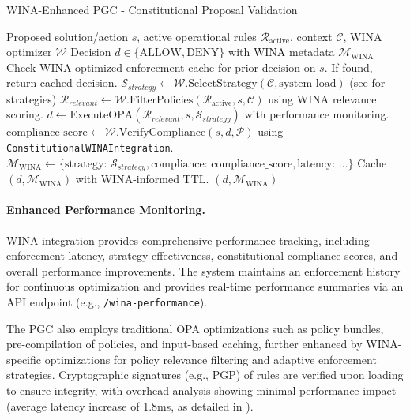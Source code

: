 \documentclass[manuscript,screen,review,anonymous,9pt]{acmart}
\begin{document}
\begin{algorithm}[!htbp]
\caption{WINA-Enhanced PGC - Constitutional Proposal Validation}
\label{alg:wina_pgc_validation}
\begin{algorithmic}[1]
\Require Proposed solution/action $s$, active operational rules $\mathcal{R}_{\text{active}}$, context $\mathcal{C}$, WINA optimizer $\mathcal{W}$
\Ensure Decision $d \in \{\text{ALLOW}, \text{DENY}\}$ with WINA metadata $\mathcal{M}_{\text{WINA}}$
    \State Check WINA-optimized enforcement cache for prior decision on $s$. If found, return cached decision.
    \State $\mathcal{S}_{strategy} \gets \mathcal{W}.\text{SelectStrategy}(\mathcal{C}, \text{system\_load})$ (see  for strategies)
    \State $\mathcal{R}_{relevant} \gets \mathcal{W}.\text{FilterPolicies}(\mathcal{R}_{\text{active}}, s, \mathcal{C})$ using WINA relevance scoring.
    \State $d \gets \text{ExecuteOPA}(\mathcal{R}_{relevant}, s, \mathcal{S}_{strategy})$ with performance monitoring.
    \State $\text{compliance\_score} \gets \mathcal{W}.\text{VerifyCompliance}(s, d, \mathcal{P})$ using \texttt{ConstitutionalWINAIntegration}.
    \State $\mathcal{M}_{\text{WINA}} \gets \{\text{strategy: } \mathcal{S}_{strategy}, \text{compliance: } \text{compliance\_score}, \text{latency: } \dots \}$
    \State Cache $(d, \mathcal{M}_{\text{WINA}})$ with WINA-informed TTL.
    \State \Return $(d, \mathcal{M}_{\text{WINA}})$
\EndFunction
\end{algorithmic}
\end{algorithm}

\paragraph{Enhanced Performance Monitoring.} WINA integration provides comprehensive performance tracking, including enforcement latency, strategy effectiveness, constitutional compliance scores, and overall performance improvements. The system maintains an enforcement history for continuous optimization and provides real-time performance summaries via an API endpoint (e.g., \texttt{/wina-performance}).

The PGC also employs traditional OPA optimizations such as policy bundles, pre-compilation of policies, and input-based caching, further enhanced by WINA-specific optimizations for policy relevance filtering and adaptive enforcement strategies. Cryptographic signatures (e.g., PGP) of rules are verified upon loading to ensure integrity, with overhead analysis showing minimal performance impact (average latency increase of 1.8ms, as detailed in ).
\end{document}
